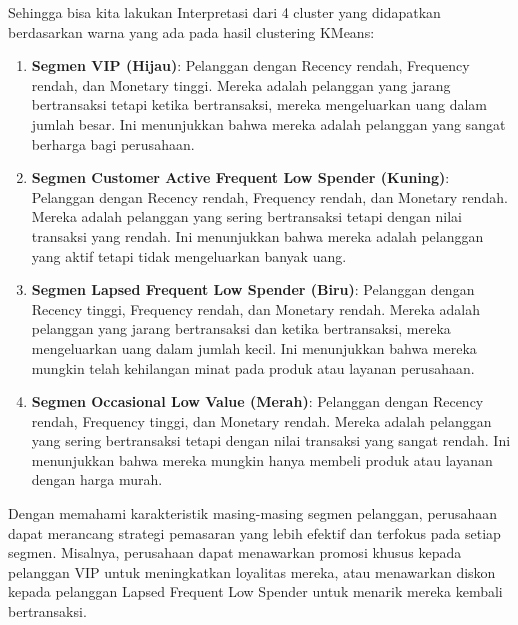 Sehingga bisa kita lakukan Interpretasi dari 4 cluster yang didapatkan berdasarkan warna yang ada pada hasil clustering KMeans:


\begin{enumerate}
    \item \textbf{Segmen VIP (Hijau)}: Pelanggan dengan Recency rendah, Frequency rendah, dan Monetary tinggi. Mereka adalah pelanggan yang jarang bertransaksi tetapi ketika bertransaksi, mereka mengeluarkan uang dalam jumlah besar. Ini menunjukkan bahwa mereka adalah pelanggan yang sangat berharga bagi perusahaan.
    \item \textbf{Segmen Customer Active Frequent Low Spender (Kuning)}: Pelanggan dengan Recency rendah, Frequency rendah, dan Monetary rendah. Mereka adalah pelanggan yang sering bertransaksi tetapi dengan nilai transaksi yang rendah. Ini menunjukkan bahwa mereka adalah pelanggan yang aktif tetapi tidak mengeluarkan banyak uang.
    \item \textbf{Segmen Lapsed Frequent Low Spender (Biru)}: Pelanggan dengan Recency tinggi, Frequency rendah, dan Monetary rendah. Mereka adalah pelanggan yang jarang bertransaksi dan ketika bertransaksi, mereka mengeluarkan uang dalam jumlah kecil. Ini menunjukkan bahwa mereka mungkin telah kehilangan minat pada produk atau layanan perusahaan.
    \item \textbf{Segmen Occasional Low Value (Merah)}: Pelanggan dengan Recency rendah, Frequency tinggi, dan Monetary rendah. Mereka adalah pelanggan yang sering bertransaksi tetapi dengan nilai transaksi yang sangat rendah. Ini menunjukkan bahwa mereka mungkin hanya membeli produk atau layanan dengan harga murah.
\end{enumerate}

Dengan memahami karakteristik masing-masing segmen pelanggan, perusahaan dapat merancang strategi pemasaran yang lebih efektif dan terfokus pada setiap segmen. Misalnya, perusahaan dapat menawarkan promosi khusus kepada pelanggan VIP untuk meningkatkan loyalitas mereka, atau menawarkan diskon kepada pelanggan Lapsed Frequent Low Spender untuk menarik mereka kembali bertransaksi.
